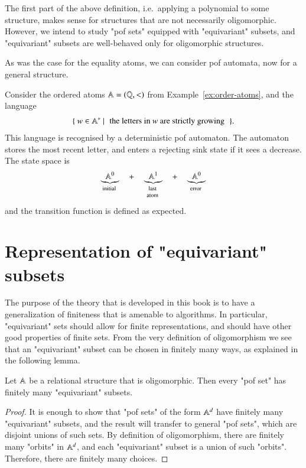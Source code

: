 The first part of the above definition, i.e.~applying a polynomial to some structure, makes sense for structures that are not necessarily oligomorphic. However, we intend to study "pof sets" equipped with "equivariant" subsets, and "equivariant" subsets are well-behaved only for oligomorphic structures. 

As was the case for the equality atoms, we can consider pof automata, now for a general structure.

\begin{myexample}
Consider the ordered atoms $\mathbb A = (\mathbb Q, <)$ from Example~\ref{ex:order-atoms}, and the language 
\begin{align*}
\setbuild{ w \in \atoms^*}{the letters in $w$ are strictly growing}.
\end{align*}
This language is recognised by a deterministic pof automaton. The automaton stores the most recent letter, and enters a rejecting sink state if it sees a decrease. The state space is 
\begin{align*}
\myunderbrace{\atoms^0}{initial}
\quad + \quad 
\myunderbrace{\atoms^1}{last\\ atom}
\quad + \quad 
\myunderbrace{\atoms^0}{error}
\end{align*}
and the transition function is defined as expected. 
\end{myexample}


\exercisepart



\section{Representation of "equivariant" subsets}
\label{sec:representation-of-equivariant-subsets}
The purpose of the theory that is developed in this book is to have a generalization of finiteness that is amenable to algorithms. In particular, "equivariant" sets should allow for finite representations, and should have other good properties of finite sets. From the very definition of oligomorphism we see that an "equivariant" subset can be chosen in finitely many ways, as explained in the following lemma.
\begin{lemma}\label{lem:finitely-many-equivariant-subsets}
    Let $\mathbb A$ be a relational structure that is oligomorphic. Then every "pof set" has finitely many "equivariant" subsets. 
\end{lemma}
\begin{proof}
It is enough to show that "pof sets" of the form $\mathbb A^d$ have finitely many "equivariant" subsets, and the result will transfer to general "pof sets", which are disjoint unions of such sets. By definition of oligomorphism, there are finitely many "orbits" in $\mathbb A^d$, and each "equivariant" subset is a union of such "orbits". Therefore, there are finitely many choices.
\end{proof}

